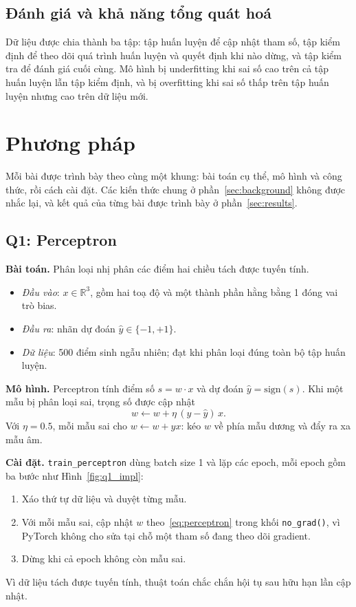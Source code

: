 \documentclass[conference]{IEEEtran}
\begin{document}
\subsection{Đánh giá và khả năng tổng quát hoá}
Dữ liệu được chia thành ba tập: tập huấn luyện để cập nhật tham số, tập kiểm
định để theo dõi quá trình huấn luyện và quyết định khi nào dừng, và tập kiểm
tra để đánh giá cuối cùng. Mô hình bị underfitting khi sai số cao trên cả tập
huấn luyện lẫn tập kiểm định, và bị overfitting khi sai số thấp trên tập huấn
luyện nhưng cao trên dữ liệu mới.

\section{Phương pháp}
\label{sec:method}

Mỗi bài được trình bày theo cùng một khung: bài toán cụ thể, mô hình và công
thức, rồi cách cài đặt. Các kiến thức chung ở phần~\ref{sec:background} không
được nhắc lại, và kết quả của từng bài được trình bày ở
phần~\ref{sec:results}.

\subsection{Q1: Perceptron}
\textbf{Bài toán.} Phân loại nhị phân các điểm hai chiều tách được tuyến tính.
\begin{itemize}
  \item \emph{Đầu vào}: $x \in \mathbb{R}^{3}$, gồm hai toạ độ và một thành
  phần hằng bằng 1 đóng vai trò bias.
  \item \emph{Đầu ra}: nhãn dự đoán $\hat{y} \in \{-1, +1\}$.
  \item \emph{Dữ liệu}: 500 điểm sinh ngẫu nhiên; đạt khi phân loại đúng toàn
  bộ tập huấn luyện.
\end{itemize}

\textbf{Mô hình.} Perceptron tính điểm số $s = w \cdot x$ và dự đoán
$\hat{y} = \mathrm{sign}(s)$. Khi một mẫu bị phân loại sai, trọng số được cập
nhật
\begin{equation}
w \leftarrow w + \eta\,(y - \hat{y})\,x.
\label{eq:perceptron}
\end{equation}
Với $\eta = 0.5$, mỗi mẫu sai cho $w \leftarrow w + yx$: kéo $w$ về phía mẫu
dương và đẩy ra xa mẫu âm.

\textbf{Cài đặt.} \texttt{train\_perceptron} dùng batch size 1 và lặp các
epoch, mỗi epoch gồm ba bước như Hình~\ref{fig:q1_impl}:
\begin{enumerate}
  \item Xáo thứ tự dữ liệu và duyệt từng mẫu.
  \item Với mỗi mẫu sai, cập nhật $w$ theo~\eqref{eq:perceptron} trong khối
  \texttt{no\_grad()}, vì PyTorch không cho sửa tại chỗ một tham số đang theo
  dõi gradient.
  \item Dừng khi cả epoch không còn mẫu sai.
\end{enumerate}
Vì dữ liệu tách được tuyến tính, thuật toán chắc chắn hội tụ sau hữu hạn lần
cập nhật.
\end{document}
